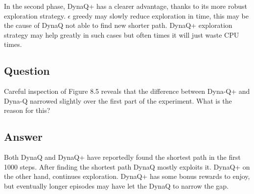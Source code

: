 \documentclass[11pt]{article}
\begin{document}
    In the second phase, DynaQ+ has a clearer advantage, thanks to its more robust exploration strategy.
    $\epsilon$ greedy may slowly reduce exploration in time, this may be the cause of DynaQ not able to find new shorter path.
    DynaQ+ exploration strategy may help greatly in such cases but often times it will just waste CPU times.

    \subsection{Question}

    Careful inspection of Figure 8.5 reveals that the difference between Dyna-Q+ and Dyna-Q narrowed slightly over the first part of the experiment.
    What is the reason for this?

    \subsection*{Answer}

    Both DynaQ and DynaQ+ have reportedly found the shortest path in the first 1000 steps.
    After finding the shortest path DynaQ mostly exploits it.
    DynaQ+ on the other hand, continues exploration.
    DynaQ+ has some bonus rewards to enjoy, but eventually longer episodes may have let the DynaQ to narrow the gap.

    
\end{document}
